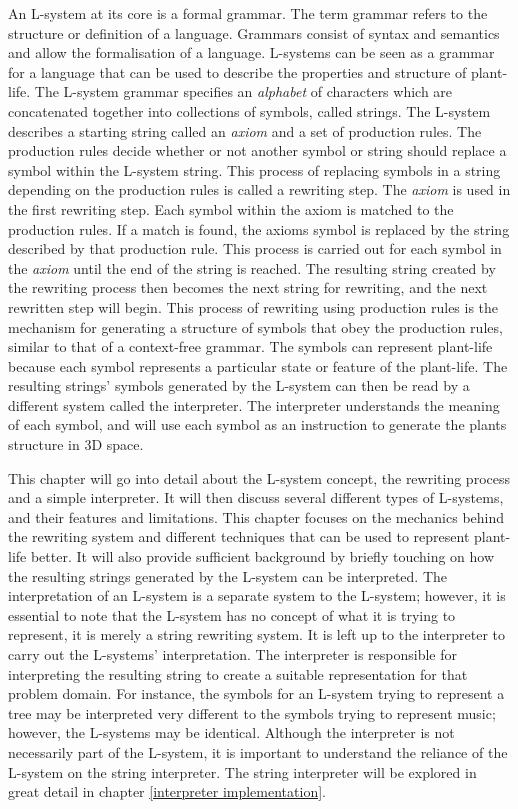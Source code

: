 
\lettrine[lines=3]{A}{}n L-system at its core is a formal grammar. The term grammar refers to the structure or definition of a language. Grammars consist of syntax and semantics and allow the formalisation of a language. L-systems can be seen as a grammar for a language that can be used to describe the properties and structure of plant-life. The L-system grammar specifies an \textit{alphabet} of characters which are concatenated together into collections of symbols, called strings. The L-system describes a starting string called an \textit{axiom} and a set of production rules. The production rules decide whether or not another symbol or string should replace a symbol within the L-system string. This process of replacing symbols in a string depending on the production rules is called a rewriting step. The \textit{axiom} is used in the first rewriting step. Each symbol within the axiom is matched to the production rules. If a match is found, the axioms symbol is replaced by the string described by that production rule. This process is carried out for each symbol in the \textit{axiom} until the end of the string is reached. The resulting string created by the rewriting process then becomes the next string for rewriting, and the next rewritten step will begin. This process of rewriting using production rules is the mechanism for generating a structure of symbols that obey the production rules, similar to that of a context-free grammar. The symbols can represent plant-life because each symbol represents a particular state or feature of the plant-life. The resulting strings' symbols generated by the L-system can then be read by a different system called the interpreter. The interpreter understands the meaning of each symbol, and will use each symbol as an instruction to generate the plants structure in 3D space.

This chapter will go into detail about the L-system concept, the rewriting process and a simple interpreter. It will then discuss several different types of L-systems, and their features and limitations. This chapter focuses on the mechanics behind the rewriting system and different techniques that can be used to represent plant-life better. It will also provide sufficient background by briefly touching on how the resulting strings generated by the L-system can be interpreted. The interpretation of an L-system is a separate system to the L-system; however, it is essential to note that the L-system has no concept of what it is trying to represent, it is merely a string rewriting system. It is left up to the interpreter to carry out the L-systems' interpretation. The interpreter is responsible for interpreting the resulting string to create a suitable representation for that problem domain. For instance, the symbols for an L-system trying to represent a tree may be interpreted very different to the symbols trying to represent music; however, the L-systems may be identical. Although the interpreter is not necessarily part of the L-system, it is important to understand the reliance of the L-system on the string interpreter. The string interpreter will be explored in great detail in chapter \ref{interpreter implementation}.


